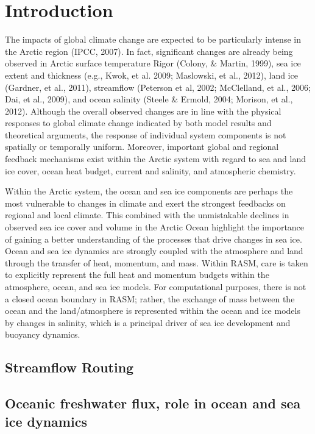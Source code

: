 \section{Introduction}
 
The impacts of global climate change are expected to be particularly intense in the Arctic region (IPCC, 2007).
In fact, significant changes are already being observed in Arctic surface temperature Rigor (Colony, & Martin, 1999), sea ice extent and thickness (e.g., Kwok, et al. 2009; Maslowski, et al., 2012), land ice (Gardner, et al., 2011), streamflow (Peterson et al, 2002; McClelland, et al., 2006; Dai, et al., 2009), and ocean salinity (Steele & Ermold, 2004; Morison, et al., 2012).
Although the overall observed changes are in line with the physical responses to global climate change indicated by both model results and theoretical arguments, the response of individual system components is not spatially or temporally uniform.
Moreover, important global and regional feedback mechanisms exist within the Arctic system with regard to sea and land ice cover, ocean heat budget, current and salinity, and atmospheric chemistry.

Within the Arctic system, the ocean and sea ice components are perhaps the most vulnerable to changes in climate and exert the strongest feedbacks on regional and local climate.
This combined with the unmistakable declines in observed sea ice cover and volume in the Arctic Ocean highlight the importance of gaining a better understanding of the processes that drive changes in sea ice.
Ocean and sea ice dynamics are strongly coupled with the atmosphere and land through the transfer of heat, momentum, and mass. Within RASM, care is taken to explicitly represent the full heat and momentum budgets within the atmosphere, ocean, and sea ice models.
For computational purposes, there is not a closed ocean boundary in RASM; rather, the exchange of mass between the ocean and the land/atmosphere is represented within the ocean and ice models by changes in salinity, which is a principal driver of sea ice development and buoyancy dynamics. 
  
\subsection{Streamflow Routing}

\subsection{Oceanic freshwater flux, role in ocean and sea ice dynamics}

